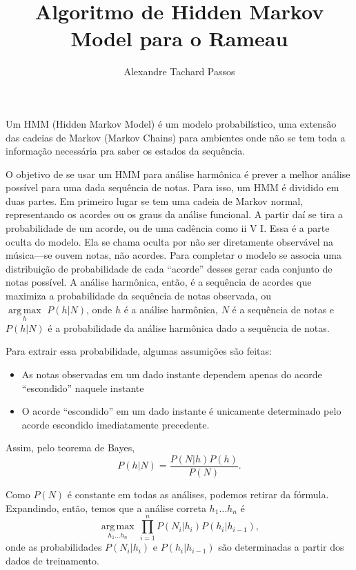 \documentclass{article}
\title{Algoritmo de Hidden Markov Model para o Rameau}
\author{Alexandre Tachard Passos}
\newcommand{\argmax}[1]{\underset{#1}{\operatorname{arg\,max}}\,}
\begin{document}
\maketitle

Um HMM (Hidden Markov Model) é um modelo probabilístico, uma       
extensão das cadeias de Markov (Markov Chains) para ambientes onde 
não se tem toda a informação necessária pra saber os estados da    
sequência.                                                         
                                                                   
O objetivo de se usar um HMM para análise harmônica é prever a melhor
análise possível para uma dada sequência de notas. Para isso, um HMM é
dividido em duas partes. Em primeiro lugar se tem uma cadeia de Markov
normal, representando os acordes ou os graus da análise funcional. A
partir daí se tira a probabilidade de um acorde, ou de uma cadência
como ii V I. Essa é a parte oculta do modelo. Ela se chama oculta por
não ser diretamente observável na música---se ouvem notas, não
acordes. Para completar o modelo se associa uma distribuição de
probabilidade de cada ``acorde'' desses gerar cada conjunto de notas
possível. A análise harmônica, então, é a sequência de acordes que
maximiza a probabilidade da sequência de notas observada, ou $
\argmax{h} \, P(h|N) $, onde $h$ é a análise
harmônica, $N$ é a sequência de notas e $P(h|N)$ é a probabilidade da
análise harmônica dado a sequência de notas.
                                                                   
Para extrair essa probabilidade, algumas assumições são feitas:    
\begin{itemize}                                                    
 \item As notas observadas em um dado instante dependem apenas do  
   acorde ``escondido'' naquele instante                           
 \item O acorde ``escondido'' em um dado instante é unicamente     
   determinado pelo acorde escondido imediatamente precedente.     
\end{itemize}                                                      
                                                                   
Assim, pelo teorema de Bayes,
\[P(h|N) = \frac{P(N|h)P(h)}{P(N)}.\]

Como $P(N)$ é constante em todas as análises, podemos retirar da
fórmula. Expandindo, então, temos que a análise correta $h_1 \ldots
h_n$ é
\[\argmax{h_1 \ldots h_n} \prod_{i=1}^n P(N_i|h_i)P(h_i|h_{i-1}),\]
onde as probabilidades $P(N_i|h_i)$ e $P(h_i|h_{i-1})$ são
determinadas a partir dos dados de treinamento.
\end{document}
